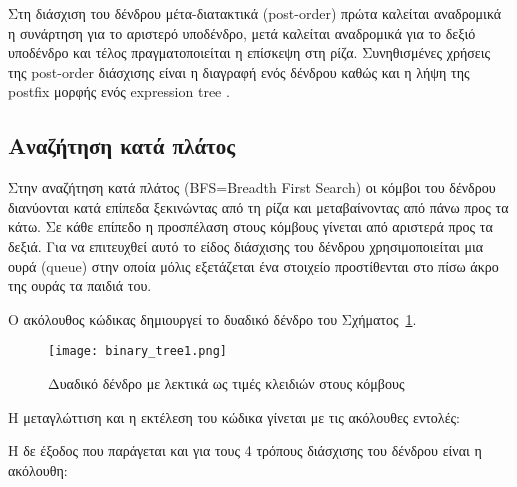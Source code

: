 Στη διάσχιση του δένδρου μέτα-διατακτικά (post-order) πρώτα καλείται αναδρομικά η  συνάρτηση για το αριστερό υποδένδρο, μετά καλείται αναδρομικά για το δεξιό υποδένδρο και τέλος πραγματοποιείται η επίσκεψη στη ρίζα. 
Συνηθισμένες χρήσεις της post-order διάσχισης είναι η διαγραφή ενός δένδρου καθώς και η λήψη της postfix μορφής ενός expression tree \cite{wikipedia_reverse_polish_notation}.

\subsection{Αναζήτηση κατά πλάτος}

Στην αναζήτηση κατά πλάτος (BFS=Breadth First Search) οι κόμβοι του δένδρου διανύονται κατά επίπεδα ξεκινώντας από τη ρίζα και μεταβαίνοντας από πάνω προς τα κάτω. Σε κάθε επίπεδο η προσπέλαση στους κόμβους γίνεται από αριστερά προς τα δεξιά. Για να επιτευχθεί αυτό το είδος διάσχισης του δένδρου χρησιμοποιείται μια ουρά (queue) στην οποία μόλις εξετάζεται ένα στοιχείο προστίθενται στο πίσω άκρο της ουράς τα παιδιά του.





Ο ακόλουθος κώδικας δημιουργεί το δυαδικό δένδρο του Σχήματος~\ref{fig:binary_tree1}.

\begin{figure}[htbp]
  \centering
  \begin{minipage}[b]{0.3\textwidth}
  \texttt{[image: binary\_tree1.png]}
  \label{fig:binary_tree1}
  \end{minipage}
  \caption{Δυαδικό δένδρο με λεκτικά ως τιμές κλειδιών στους κόμβους}
\end{figure}



Η μεταγλώττιση και η εκτέλεση του κώδικα γίνεται με τις ακόλουθες εντολές:



Η δε έξοδος που παράγεται και για τους 4 τρόπους διάσχισης του δένδρου είναι η ακόλουθη:




